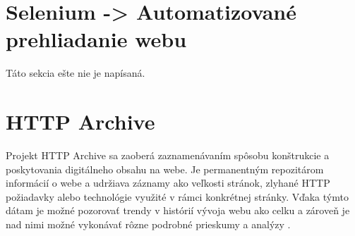 
            
            


    


\section{Selenium -> Automatizované prehliadanie webu}
\label{selenium}

Táto sekcia ešte nie je napísaná.

\section{HTTP Archive}
\label{httparchive}

Projekt HTTP Archive sa zaoberá zaznamenávaním spôsobu konštrukcie a poskytovania digitálneho obsahu na webe. Je permanentným repozitárom informácií o webe a udržiava záznamy ako veľkosti
stránok, zlyhané HTTP požiadavky alebo technológie využité v rámci konkrétnej stránky. Vďaka týmto dátam je možné pozorovať trendy v histórií vývoja webu ako celku a zároveň je nad nimi možné vykonávať
rôzne podrobné prieskumy a analýzy \cite{httparchive-about}. 

